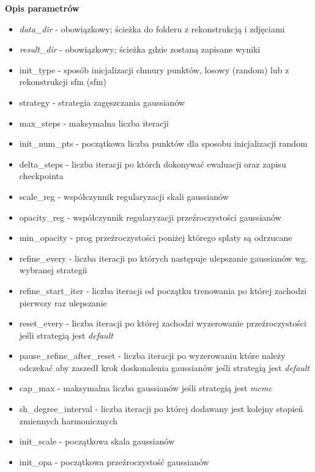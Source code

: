 \textbf{Opis parametrów}
\begin{itemize}
  \item \textit{data\_dir} - obowiązkowy; ścieżka do folderu z rekonstrukcją i zdjęciami
  \item \textit{result\_dir} - obowiązkowy; ścieżka gdzie zostaną zapisane wyniki
  \item init\_type - sposób inicjalizacji chmury punktów, losowy (random) lub z rekonstrukcji sfm (sfm)
  \item strategy - strategia zagęszczania gaussianów
  \item max\_steps - maksymalna liczba iteracji
  \item init\_num\_pts - początkowa liczba punktów dla sposobu inicjalizacji random
  \item delta\_steps - liczba iteracji po którch dokonywać ewaluacji oraz zapisu checkpointa
  \item scale\_reg - współczynnik regularyzacji skali gaussianów
  \item opacity\_reg - współczynnik regularyzacji przeźroczystości gaussianów
  \item min\_opacity - prog przeźroczystości poniżej którego splaty są odrzucane
  \item refine\_every - liczba iteracji po których następuje ulepszanie gaussianów wg. wybranej strategii 
  \item refine\_start\_iter - liczba iteracji od początku trenowania po której zachodzi pierwszy raz ulepszanie
  \item reset\_every - liczba iteracji po której zachodzi wyzerowanie przeźroczystości jeśli strategią jest \textit{default}
  \item pause\_refine\_after\_reset - liczba iteracji po wyzerowaniu które należy odczekać aby zaszedł krok doskonalenia gaussianów jeśli strategią jest \textit{default}
  \item cap\_max - maksymalna liczba gaussianów jeśli strategią jest \textit{mcmc}
  \item sh\_degree\_interval - liczba iteracji po której dodawany jest kolejny stopień zmiennych harmonicznych 
  \item init\_scale - początkowa skala gaussianów 
  \item init\_opa - początkowa przeźroczystość gaussianów
\end{itemize}